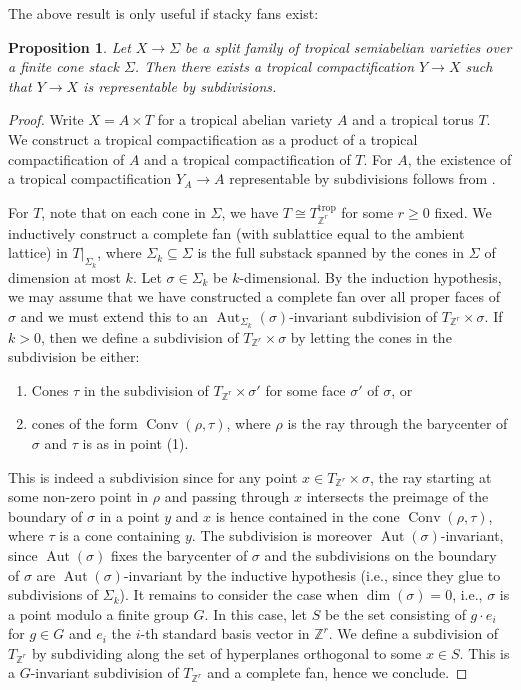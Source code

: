 \documentclass[11pt]{amsart}
\newtheorem{proposition}[theorem]{Proposition}
\theoremstyle{definition}
\theoremstyle{remark}
\DeclareMathOperator{\Aut}{Aut}
\DeclareMathOperator{\Conv}{Conv}
\def\trop{\mathrm{trop}}
\begin{document}
The above result is only useful if stacky fans exist:

\begin{proposition}
	\label{prop:stacky_fan_exists}
	Let $X\to \Sigma$ be a split family of tropical semiabelian varieties over a finite cone stack $\Sigma$.
	Then there exists a tropical compactification $Y\to X$ such that $Y\to X$ is representable
	by subdivisions.
\end{proposition}

\begin{proof}
	Write $X=A\times T$ for a tropical abelian variety $A$ and a tropical torus $T$.
	We construct a tropical compactification as a product of a tropical compactification of $A$
	and a tropical compactification of $T$.
	For $A$, the existence of a tropical compactification $Y_A\to A$ representable by subdivisions
	follows from \cite[Theorem 1.11]{kajiwara2018logarithmic}.

	For $T$, note that on each cone in $\Sigma$, we have
	$T\cong T_{\mathbb{Z}^{r}}^{\trop}$ for some $r\ge 0$ fixed. We inductively
	construct a complete fan (with sublattice equal to the ambient lattice) in $T|_{\Sigma_k}$, where $\Sigma_k\subseteq \Sigma$
	is the full substack spanned by the cones in $\Sigma$ of dimension
	at most $k$. Let $\sigma\in \Sigma_k$ be $k$-dimensional. By the induction hypothesis, we may
	assume that we have constructed a complete fan over all proper faces of $\sigma$ and we must
	extend this to an $\Aut_{\Sigma_k}(\sigma)$-invariant subdivision of $T_{\mathbb{Z}^{r}}\times \sigma$.
	If $k>0$, then we define a subdivision of $T_{\mathbb{Z}^{r}}\times \sigma$ by letting the cones in the
	subdivision be either:
	\begin{enumerate}
		\item Cones $\tau$ in the subdivision of $T_{\mathbb{Z}^{r}}\times \sigma'$ for some face $\sigma'$ of $\sigma$, or
		\item cones of the form $\Conv(\rho,\tau)$, where $\rho$ is the ray through the barycenter of $\sigma$ and $\tau$ is as in point (1).
	\end{enumerate}
	This is indeed a subdivision since for any point $x\in T_{\mathbb{Z}^{r}}\times \sigma$, the ray starting at some non-zero
	point in $\rho$ and passing through $x$ intersects the preimage of the boundary of $\sigma$ in a point $y$ and $x$ is hence contained
	in the cone $\Conv(\rho,\tau)$, where $\tau$ is a cone containing $y$. The subdivision is moreover $\Aut(\sigma)$-invariant,
	since $\Aut(\sigma)$ fixes the barycenter of $\sigma$ and the subdivisions on the boundary of $\sigma$ are $\Aut(\sigma)$-invariant
	by the inductive hypothesis (i.e., since they glue to subdivisions of $\Sigma_k$). It remains to consider the case when $\dim(\sigma)=0$,
	i.e., $\sigma$ is a point modulo a finite group $G$. In this case, let $S$ be the set consisting of
	$g\cdot e_i$ for $g\in G$ and $e_i$ the $i$-th standard basis vector in $\mathbb{Z}^{r}$. We define a subdivision of $T_{\mathbb{Z}^{r}}$
	by subdividing along the set of hyperplanes orthogonal to some $x\in S$. This is a $G$-invariant subdivision of $T_{\mathbb{Z}^{r}}$
	and a complete fan, hence we conclude.
\end{proof}
\end{document}
